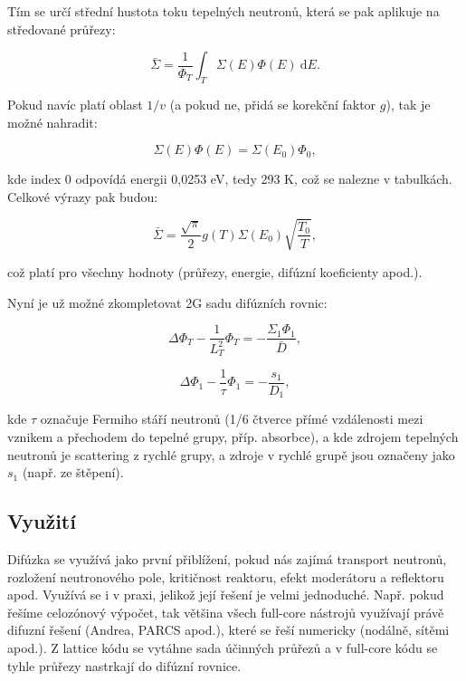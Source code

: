 Tím se určí střední hustota toku tepelných neutronů, která se pak aplikuje na středované průřezy:

$$ \bar{\Sigma} = \dfrac{1}{\Phi_T} \int_T \Sigma(E) \Phi(E) \: \text{d}E.$$

Pokud navíc platí oblast $1/v$ (a pokud ne, přidá se korekční faktor $g$), tak je možné nahradit:

$$ \Sigma(E) \Phi(E) = \Sigma(E_0) \Phi_0, $$

kde index 0 odpovídá energii 0,0253 eV, tedy 293 K, což se nalezne v tabulkách. Celkové výrazy pak budou:

$$ \boxed{\bar{\Sigma} = \dfrac{\sqrt{\pi}}{2} g(T) \Sigma(E_0) \sqrt{\dfrac{T_0}{T}},} $$

což platí pro všechny hodnoty (průřezy, energie, difúzní koeficienty apod.).

Nyní je už možné zkompletovat 2G sadu difúzních rovnic:

\begin{equation}
    \boxed{
        \Delta \Phi_T - \dfrac{1}{L_T^2} \Phi_T = -\dfrac{\Sigma_1 \Phi_1}{\bar{D}},
    }
\end{equation}

\begin{equation}
    \boxed{
        \Delta \Phi_1 - \dfrac{1}{\tau} \Phi_1 = -\dfrac{s_1}{D_1},
    }
\end{equation}

kde $\tau$ označuje Fermiho stáří neutronů (1/6 čtverce přímé vzdálenosti mezi vznikem a přechodem do tepelné grupy, příp. absorbce), a kde zdrojem tepelných neutronů je scattering z rychlé grupy, a zdroje v rychlé grupě jsou označeny jako $s_1$ (např. ze štěpení).

\subsection{Využití}

Difúzka se využívá jako první přiblížení, pokud nás zajímá transport neutronů, rozložení neutronového pole, kritičnost reaktoru, efekt moderátoru a reflektoru apod. Využívá se i v praxi, jelikož její řešení je velmi jednoduché. Např. pokud řešíme celozónový výpočet, tak většina všech full-core nástrojů využívají právě difuzní řešení (Andrea, PARCS apod.), které se řeší numericky (nodálně, sítěmi apod.). Z lattice kódu se vytáhne sada účinných průřezů a v full-core kódu se tyhle průřezy nastrkají do difúzní rovnice.
